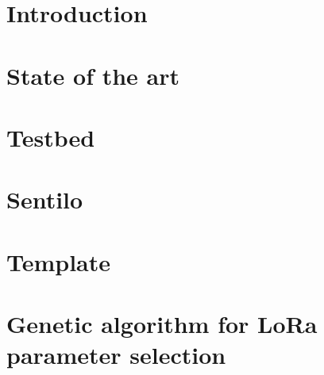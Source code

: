 \documentclass[conference]{../../setup/IEEEtran}
\begin{document}
\preface
\body

\begin{refsection}
\chapter[''The secret of a good sermon is to have a good beginning and a good ending, then having the two as close as possible'' - George Burns]{Introduction}
	
\chapter[''Given one hour to save the planet, I would spend 59 minutes understanding the problem and one minute resolving it.'' - Albert Einstein]{State of the art}
	
	
	
	
	
	
\chapter[''Human identity is no longer defined by what one does, but by what one owns. This is not a message of happiness or reassurance, but it is the truth and it is a warning.'' - Jimmy Carter]{Testbed}
	
	
	
	
	
	
	
	
\chapter[''il  ne faut jamais déclarer la victoire dans une guerre.'' - Matoub Lounès]{Sentilo}
	
	
	
	
	
	
	
	
\chapter[''Dans tout conflit, découvrez celui qui se frotte les mains ... Vous verrez que ce n'est jamais celui qui se bagarre !''  - Marc Roussel]{Template}
	
	
	
	
	
	
	
	
\chapter[''I know what to do and I go and execute'' - Usain Bolt]{Genetic algorithm for LoRa parameter selection}
	
	
	
	
	
	

\end{refsection}
\end{document}
